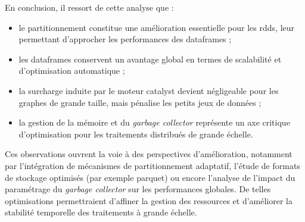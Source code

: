 \documentclass[conference]{IEEEtran}
\begin{document}
En conclusion, il ressort de cette analyse que :
\begin{itemize}
    \item le partitionnement constitue une amélioration essentielle pour les \glspl{rdd}, leur permettant d'approcher les performances des \glspl{dataframe} ;
    \item les \glspl{dataframe} conservent un avantage global en termes de scalabilité et d'optimisation automatique ;
    \item la surcharge induite par le moteur \gls{catalyst} devient négligeable pour les graphes de grande taille, mais pénalise les petits jeux de données ;
    \item la gestion de la mémoire et du \textit{garbage collector} représente un axe critique d'optimisation pour les traitements distribués de grande échelle.
\end{itemize}

Ces observations ouvrent la voie à des perspectives d'amélioration, notamment par l'intégration de mécanismes de partitionnement adaptatif, l'étude de formats de stockage optimisés (par exemple \gls{parquet}) ou encore l'analyse de l'impact du paramétrage du \textit{garbage collector} sur les performances globales.  
De telles optimisations permettraient d'affiner la gestion des ressources et d'améliorer la stabilité temporelle des traitements à grande échelle.

\clearpage

\printglossary[type=\acronymtype, title={Liste des acronymes}]
\printglossary[title={Glossaire}]

\printbibliography[title={Bibliographie}]
\end{document}
